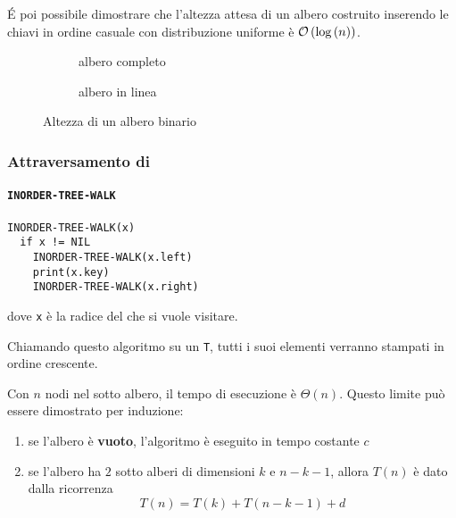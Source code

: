 \documentclass[italian, 10pt]{article}
\begin{document}
\bigskip
É poi possibile dimostrare che l'altezza attesa di un albero costruito inserendo le chiavi in ordine casuale con distribuzione uniforme è \(\mathcal{O}\left(\log{(n)}\right)\).

\begin{figure}[htbp]
  \bigskip
  \centering
  \begin{subfigure}[b]{0.495\textwidth}
    \centering
    \caption{albero completo}
  \end{subfigure}
  \begin{subfigure}[b]{0.495\textwidth}
    \centering
    \caption{albero in linea}
  \end{subfigure}
  \caption{Altezza di un albero binario}
  \label{fig:altezza-albero-binario}
  \bigskip
\end{figure}

\subsubsection{Attraversamento di \BST}

\paragraph{\texttt{INORDER-TREE-WALK} }

\begin{lstlisting}[style=pseudocode, caption={Attraversamento simmetrico di \BST}, label={lst:attraversamento-bst-inorder}]
INORDER-TREE-WALK(x)
  if x != NIL
    INORDER-TREE-WALK(x.left)
    print(x.key)
    INORDER-TREE-WALK(x.right)
\end{lstlisting}

dove \texttt{x} è la radice del \BST che si vuole visitare.

\bigskip
Chiamando questo algoritmo su un \BST \texttt{T}, tutti i suoi elementi verranno stampati in ordine crescente.

Con \(n\) nodi nel sotto albero, il tempo di esecuzione è \(\Theta(n)\).
Questo limite può essere dimostrato per induzione:

\begin{enumerate}
  \item se l'albero è \textbf{vuoto}, l'algoritmo è eseguito in tempo costante \(c\)
  \item se l'albero ha \(2\) sotto alberi di dimensioni \(k\) e \(n - k - 1\), allora \(T(n)\) è dato dalla ricorrenza
        \[ T(n) = T(k) + T(n - k - 1) + d \]
\end{enumerate}
\end{document}
